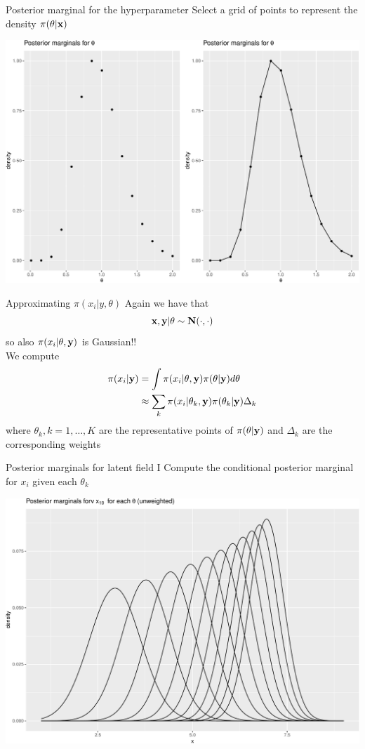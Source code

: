 \documentclass[
  ignorenonframetext,
]{beamer}
\begin{document}
\begin{frame}{Posterior marginal for the hyperparameter}
\protect\hypertarget{posterior-marginal-for-the-hyperparameter}{}
Select a grid of points to represent the density \(\pi(\theta|\bf{x})\)

\begin{center}\includegraphics[width=0.6\linewidth]{Part1_intro_files/figure-beamer/unnamed-chunk-12-1} \end{center}
\end{frame}

\begin{frame}{Approximating \(\pi(x_i|y,\theta)\)}
\protect\hypertarget{approximating-pix_iytheta}{}
Again we have that \[
    \bf{x},\bf{y}|\theta\sim\mathbf{N}(\cdot,\cdot)
\] so also \(\pi(x_i|\theta,\bf{y})\) is Gaussian!!\\

We compute \begin{align*}
\pi(x_i|{\bf y}) &= \int \pi(x_i|\theta,{\bf y})\pi(\theta|{\bf y})d\theta\\
      &\approx \sum_k\pi(x_i|\theta_k,{\bf y})\pi(\theta_k|{\bf y}) \Delta_k
\end{align*} where \(\theta_k,k=1,\dots,K\) are the representative
points of \(\pi(\theta|\bf{y})\) and \(\Delta_k\) are the corresponding
weights
\end{frame}

\begin{frame}{Posterior marginals for latent field I}
\protect\hypertarget{posterior-marginals-for-latent-field-i}{}
Compute the conditional posterior marginal for \(x_i\) given each
\(\theta_k\)\\

\begin{center}\includegraphics[width=0.6\linewidth]{Part1_intro_files/figure-beamer/unnamed-chunk-13-1} \end{center}
\end{frame}
\end{document}
